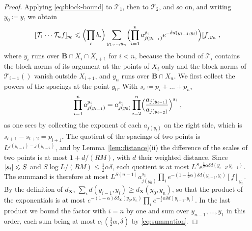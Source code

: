 \documentclass[11pt]{preprint}
\makeatletter
\DeclarePairedDelimiter{\abs}{\lvert}{\rvert}
\newcommand*{\bigcdot}{}%
\DeclareRobustCommand*{\bigcdot}{%
	\mathbin{\mathpalette\bigcdot@{}}%
}
\newcommand*{\bigcdot@scalefactor}{.7}
\newcommand*{\bigcdot@widthfactor}{1.15}
\newcommand*{\bigcdot@}[2]{%
	\sbox0{$#1\vcenter{}$}%
	\sbox2{$#1\cdot\m@th$}%
	\hbox to \bigcdot@widthfactor\wd2{%
		\hss
		\raise\ht0\hbox{%
			\scalebox{\bigcdot@scalefactor}{%
				\lower\ht0\hbox{$#1\bullet\m@th$}%
			}%
		}%
		\hss
	}%
}
\numberwithin{equation}{section}
\makeatother
\begin{document}
\begin{proof}
Applying \eqref{eq:block-bound} to $\mathcal T_1$, then to $\mathcal T_2$, and so on, and writing $y_0 \coloneqq y$, we obtain
\[
    [\mathcal T_1\cdots\mathcal T_nf]_{y_0} \leqslant \Bigl(\prod_ib_i\Bigr)\sum_{y_1, \dots, y_n}\Bigl(\prod_{i=1}^{n}a_{j(y_{i-1})}^{p_i}e^{-\delta d(y_{i-1}, y_i)}\Bigr)[f]_{y_n}\;,
\]
where $y_i$ runs over $\mathbf B \cap X_i \cap X_{i+1}$ for $i < n$, because the bound of $\mathcal T_i$ contains the block norms of its argument at the points of $X_i$ only and the block norms of $\mathcal T_{i+1}(\bigcdot)$ vanish outside $X_{i+1}$, and $y_n$ runs over $\mathbf B \cap X_n$. We first collect the powers of the spacings at the point $y_0$. With $s_i \coloneqq p_i + \dots + p_n$,
\[
    \prod_{i=1}^{n}a_{j(y_{i-1})}^{p_i} = a_{j(y_0)}^{s_1}\prod_{i=2}^{n}\Bigl(\frac{a_{j(y_{i-1})}}{a_{j(y_{i-2})}}\Bigr)^{s_i}\;,
\]
as one sees by collecting the exponent of each $a_{j(y_l)}$ on the right side, which is $s_{l+1} - s_{l+2} = p_{l+1}$. The quotient of the spacings of two points is $L^{j(y_{i-1}) - j(y_{i-2})}$, and by Lemma~\ref{lem:distance}(ii) the difference of the scales of two points is at most $1 + d/(RM)$, with $d$ their weighted distance. Since $\abs{s_i} \leqslant S$ and $S\log L/(RM) \leqslant \frac{1}{2}\alpha\delta$, each quotient is at most $L^Se^{\frac{1}{2}\alpha\delta d(y_{i-2}, y_{i-1})}$. The summand is therefore at most $L^{S(n-1)}a_{j(y_0)}^{s_1}\prod_ie^{-(1 - \frac{1}{2}\alpha)\delta d(y_{i-1}, y_i)}[f]_{y_n}$. By the definition of $d_{\mathbf X}$, $\sum_id(y_{i-1}, y_i) \geqslant d_{\mathbf X}(y_0, y_n)$, so that the product of the exponentials is at most $e^{-(1 - \alpha)\delta d_{\mathbf X}(y_0, y_n)}\prod_ie^{-\frac{1}{2}\alpha\delta d(y_{i-1}, y_i)}$. In the last product we bound the factor with $i = n$ by one and sum over $y_{n-1}, \dots, y_1$ in this order, each sum being at most $c_1(\frac{1}{2}\alpha, \delta)$ by \eqref{eq:summation}.
\end{proof}
\end{document}

